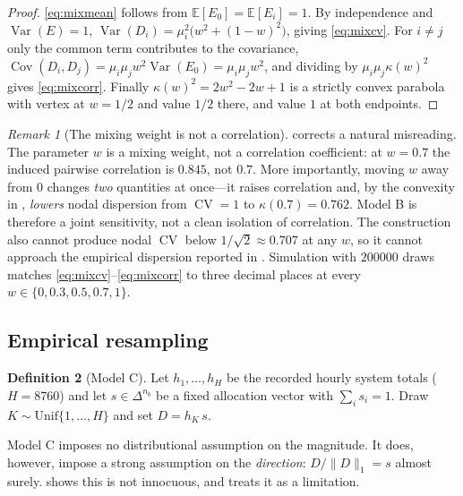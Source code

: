 \documentclass[11pt,a4paper]{article}
\theoremstyle{definition}
\newtheorem{definition}{Definition}[section]
\theoremstyle{plain}
\theoremstyle{remark}
\newtheorem{remark}[definition]{Remark}
\newcommand{\E}{\mathbb{E}}
\newcommand{\Var}{\operatorname{Var}}
\newcommand{\Cov}{\operatorname{Cov}}
\newcommand{\CV}{\operatorname{CV}}
\newcommand{\simplex}{\Delta}
\begin{document}
\begin{proof}
\eqref{eq:mixmean} follows from $\E[E_0]=\E[E_i]=1$. By independence and
$\Var(E)=1$, $\Var(D_i) = \mu_i^2\bigl(w^2 + (1-w)^2\bigr)$, giving
\eqref{eq:mixcv}. For $i\ne j$ only the common term contributes to the
covariance, $\Cov(D_i,D_j) = \mu_i\mu_j w^2 \Var(E_0) = \mu_i \mu_j w^2$, and
dividing by $\mu_i\mu_j\kappa(w)^2$ gives \eqref{eq:mixcorr}. Finally
$\kappa(w)^2 = 2w^2 - 2w + 1$ is a strictly convex parabola with vertex at
$w=1/2$ and value $1/2$ there, and value $1$ at both endpoints.
\end{proof}

\begin{remark}[The mixing weight is not a correlation]\label{rem:w}
 corrects a natural misreading. The parameter $w$ is a mixing
weight, not a correlation coefficient: at $w = 0.7$ the induced pairwise
correlation is $0.845$, not $0.7$. More importantly, moving $w$ away from $0$
changes \emph{two} quantities at once---it raises correlation and, by the
convexity in , \emph{lowers} nodal dispersion from
$\CV = 1$ to $\kappa(0.7) = 0.762$. Model B is therefore a joint sensitivity,
not a clean isolation of correlation. The construction also cannot produce nodal
$\CV$ below $1/\sqrt2 \approx 0.707$ at any $w$, so it cannot approach the
empirical dispersion reported in . Simulation with
$\num{200000}$ draws matches \eqref{eq:mixcv}--\eqref{eq:mixcorr} to three
decimal places at every $w \in \{0,0.3,0.5,0.7,1\}$.
\end{remark}

\subsection{Empirical resampling}

\begin{definition}[Model C]\label{def:modelC}
Let $h_1,\dots,h_H$ be the recorded hourly system totals ($H = \num{8760}$) and
let $s \in \simplex^{n_b}$ be a fixed allocation vector with $\sum_i s_i = 1$.
Draw $K \sim \mathrm{Unif}\{1,\dots,H\}$ and set $D = h_K\, s$.
\end{definition}

Model C imposes no distributional assumption on the magnitude. It does, however,
impose a strong assumption on the \emph{direction}: $D/\lVert D\rVert_1 = s$
almost surely.  shows this is not innocuous, and
 treats it as a limitation.
\end{document}
